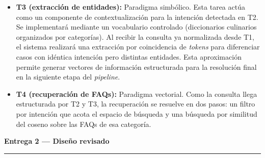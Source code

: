 \documentclass[11pt,a4paper,twoside]{article}
\theoremstyle{definition}
\numberwithin{equation}{section}
\begin{document}
\begin{itemize}
	\item \textbf{T3 (extracción de entidades):} Paradigma simbólico. Esta tarea actúa como un componente de contextualización para la intención detectada en T2. Se implementará mediante un vocabulario controlado (diccionarios culinarios organizados por categorías). Al recibir la consulta ya normalizada desde T1, el sistema realizará una extracción por coincidencia de \textit{tokens} para diferenciar casos con idéntica intención pero distintas entidades. Esta aproximación permite generar vectores de información estructurada para la resolución final en la siguiente etapa del \textit{pipeline}.
	
	\item \textbf{T4 (recuperación de FAQs):} Paradigma vectorial. Como la consulta llega estructurada por T2 y T3, la recuperación se resuelve en dos pasos: un filtro por intención que acota el espacio de búsqueda y una búsqueda por similitud del coseno sobre las FAQs de esa categoría. 
\end{itemize}

\newpage


\begin{Large}
	\noindent \textbf{Entrega 2 --- Diseño revisado}
\end{Large}

\vspace{0.5pt}
\noindent \rule{\textwidth}{1pt}


\end{document}

